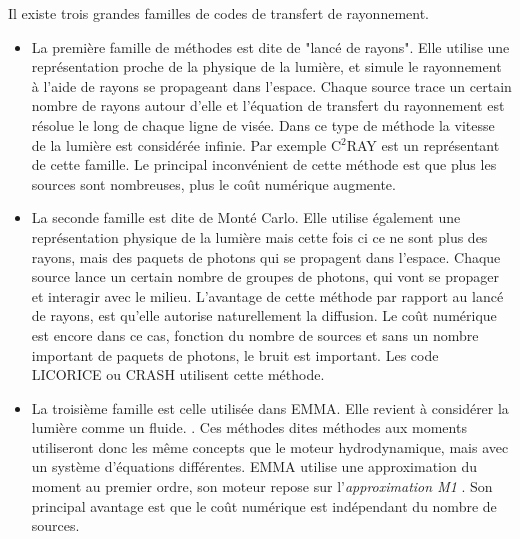 Il existe trois grandes familles de codes de transfert de rayonnement.
\begin{itemize}

\item La première famille de méthodes est dite de "lancé de rayons".
Elle utilise une représentation proche de la physique de la lumière, et simule le rayonnement à l'aide de rayons se propageant dans l'espace.
Chaque source trace un certain nombre de rayons autour d'elle et l'équation de transfert du rayonnement est résolue le long de chaque ligne de visée.
Dans ce type de méthode la vitesse de la lumière est considérée infinie.
Par exemple C$^2$RAY \citep{2006NewA...11..374M} est un représentant de cette famille.
Le principal inconvénient de cette méthode est que plus les sources sont nombreuses, plus le coût numérique augmente.

\item La seconde famille est dite de Monté Carlo.
Elle utilise également une représentation physique de la lumière mais cette fois ci ce ne sont plus des rayons, mais des paquets de photons qui se propagent dans l'espace.
Chaque source lance un certain nombre de groupes de photons, qui vont se propager et interagir avec le milieu.
L'avantage de cette méthode par rapport au lancé de rayons, est qu'elle autorise naturellement la diffusion.
Le coût numérique est encore dans ce cas, fonction du nombre de sources et sans un nombre important de paquets de photons, le bruit est important.
Les code LICORICE \citep{semelin_lyman-alpha_2007} ou CRASH \citep{2003MNRAS.345..379M} utilisent cette méthode.

\item La troisième famille est celle utilisée dans EMMA.
Elle revient à considérer la lumière comme un fluide. \citep{gnedin_multi-dimensional_2001, aubert_radiative_2008}.
Ces méthodes dites méthodes aux moments utiliseront donc les même concepts que le moteur hydrodynamique, mais avec un système d'équations différentes. 
EMMA utilise une approximation du moment au premier ordre, son moteur repose sur l'\textit{approximation M1} \citep{levermore_relating_1984, dubroca1999theoretical}.
Son principal avantage est que le coût numérique est indépendant du nombre de sources.
\end{itemize}


